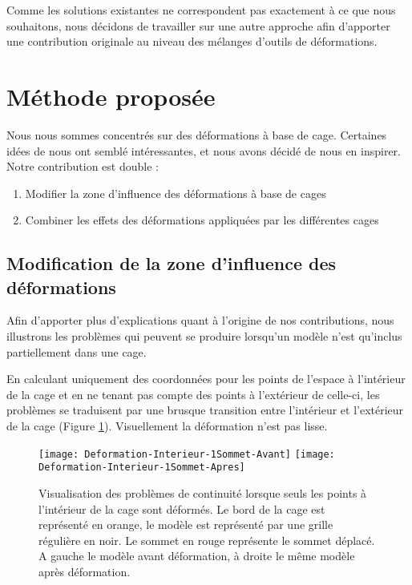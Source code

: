 Comme les solutions existantes ne correspondent pas exactement à ce que nous
souhaitons, nous décidons de travailler sur une autre approche afin
d'apporter une contribution originale au niveau des mélanges d'outils de
déformations. 

\section{Méthode proposée}

Nous nous sommes concentrés sur des déformations à base de cage. Certaines
idées de \cite{GPCP13} nous ont semblé intéressantes, et nous avons décidé de
nous en inspirer. Notre contribution est double :

\begin{enumerate}

\item Modifier la zone d'influence des déformations à base de cages

\item Combiner les effets des déformations appliquées par les différentes
cages

\end{enumerate}

\subsection{Modification de la zone d'influence des déformations}

Afin d'apporter plus d'explications quant à l'origine de nos contributions,
nous illustrons les problèmes qui peuvent se produire lorsqu'un modèle n'est
qu'inclus partiellement dans une cage.

En calculant uniquement des coordonnées pour les points de l'espace à
l'intérieur de la cage et en ne tenant pas compte des points à l'extérieur de
celle-ci, les problèmes se traduisent par une brusque transition entre
l'intérieur et l'extérieur de la cage (Figure \ref{MELVI}). Visuellement la
déformation n'est pas lisse.

\begin{figure}[ht]
  \begin{center}
    \scalebox{0.2}
    {
      \texttt{[image: Deformation-Interieur-1Sommet-Avant]}
      \texttt{[image: Deformation-Interieur-1Sommet-Apres]}
    }

    \caption[Problème de continuité déformation naïve] {Visualisation des
problèmes de continuité lorsque seuls les points à l'intérieur de la cage sont
déformés. Le bord de la cage est représenté en orange, le modèle est
représenté par une grille régulière en noir. Le sommet en rouge représente le
sommet déplacé. A gauche le modèle avant déformation, à droite le même modèle
après déformation.}

    \label{MELVI}
  \end{center}
\end{figure}

